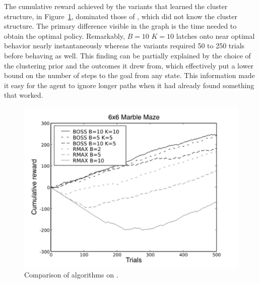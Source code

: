 The cumulative
reward achieved by the  variants that learned the cluster
structure, in Figure~\ref{f:marblegraph}, dominated those of , which did not know the cluster
structure.  The primary difference visible in the graph is the time
needed to obtain the optimal policy.  Remarkably,  $B=10$ $K=10$
latches onto near optimal behavior nearly instantaneously whereas the
 variants required 50 to 250 trials before behaving as well.
This finding can be partially explained by the choice of the clustering prior
and the outcomes it drew from, which effectively put a lower bound on
the number of steps to the goal from any state.  This information made it easy for
the agent to ignore longer paths when it had already found something that
worked.

\begin{figure}[t]
\begin{center}
\includegraphics[width=1.0\linewidth]{figures/marblemaze}
\caption{Comparison of algorithms on .}
\label{f:marblegraph}
\end{center}
\end{figure}

